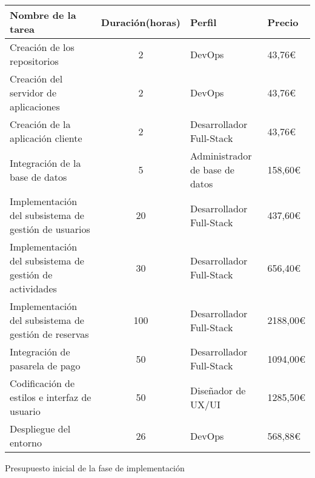 \begin{planificacion}
	\centering
	\begin{tabular}{ | m{8.5cm} | c | m{2.5cm} |  m{1.5cm} |}
		\hline
		\textbf{Nombre de la tarea}                             & \textbf{Duración(horas)} & \textbf{Perfil}                & \textbf{Precio} \\\hline
		Creación de los repositorios                            & 2                        & DevOps                         & 43,76€          \\\hline
		Creación del servidor de aplicaciones                   & 2                        & DevOps                         & 43,76€          \\\hline
		Creación de la aplicación cliente                       & 2                        & Desarrollador Full-Stack       & 43,76€          \\\hline
		Integración de la base de datos                         & 5                        & Administrador de base de datos & 158,60€         \\\hline
		Implementación del subsistema de gestión de usuarios    & 20                       & Desarrollador Full-Stack       & 437,60€         \\\hline
		Implementación del subsistema de gestión de actividades & 30                       & Desarrollador Full-Stack       & 656,40€         \\\hline
		Implementación del subsistema de gestión de reservas    & 100                      & Desarrollador Full-Stack       & 2188,00€        \\\hline
		Integración de pasarela de pago                         & 50                       & Desarrollador Full-Stack       & 1094,00€        \\\hline
		Codificación de estilos e interfaz de usuario           & 50                       & Diseñador de UX/UI             & 1285,50€        \\\hline
		Despliegue del entorno                                  & 26                       & DevOps                         & 568,88€         \\\hline
	\end{tabular}
	\caption{Presupuesto inicial de la fase de implementación}
\end{planificacion}

